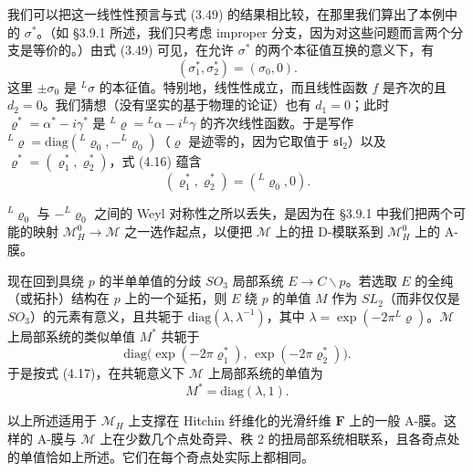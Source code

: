我们可以把这一线性性预言与式 (3.49) 的结果相比较，在那里我们算出了本例中的 $\sigma^*$。（如 §3.9.1 所述，我们只考虑 improper 分支，因为对这些问题而言两个分支是等价的。）由式 (3.49) 可见，在允许 $\sigma^*$ 的两个本征值互换的意义下，有
\begin{equation}\tag{4.16}
(\sigma_1^*,\sigma_2^*)=(\sigma_0,0).
\end{equation}
这里 $\pm\sigma_0$ 是 ${}^L\sigma$ 的本征值。特别地，线性性成立，而且线性函数 $f$ 是齐次的且 $d_2=0$。我们猜想（没有坚实的基于物理的论证）也有 $d_1=0$；此时 $\varrho^*=\alpha^*-i\gamma^*$ 是 ${}^L\varrho={}^L\alpha-i{}^L\gamma$ 的齐次线性函数。于是写作 ${}^L\varrho=\mathrm{diag}({}^L\varrho_0,-{}^L\varrho_0)$（$\varrho$ 是迹零的，因为它取值于 $\mathfrak{sl}_2$）以及 $\varrho^*=(\varrho_1^*,\varrho_2^*)$，式 (4.16) 蕴含
\begin{equation}\tag{4.17}
(\varrho_1^*,\varrho_2^*)=({}^L\varrho_0,0).
\end{equation}

${}^L\varrho_0$ 与 $-{}^L\varrho_0$ 之间的 Weyl 对称性之所以丢失，是因为在 §3.9.1 中我们把两个可能的映射 $\mathcal{M}_H^0\to\mathcal{M}$ 之一选作起点，以便把 $\mathcal{M}$ 上的扭 D-模联系到 $\mathcal{M}_H^0$ 上的 A-膜。


现在回到具绕 $p$ 的半单单值的分歧 $SO_3$ 局部系统 $E\to C\backslash p$。若选取 $E$ 的全纯（或拓扑）结构在 $p$ 上的一个延拓，则 $E$ 绕 $p$ 的单值 $M$ 作为 $SL_2$（而非仅仅是 $SO_3$）的元素有意义，且共轭于 $\mathrm{diag}(\lambda,\lambda^{-1})$，其中 $\lambda=\exp(-2\pi{}^L\varrho)$。$\mathcal{M}$ 上局部系统的类似单值 $M^*$ 共轭于
\[
\mathrm{diag}\bigl(\exp(-2\pi\varrho_1^*),\,\exp(-2\pi\varrho_2^*)\bigr).
\]
于是按式 (4.17)，在共轭意义下 $\mathcal{M}$ 上局部系统的单值为
\begin{equation}\tag{4.18}
M^*=\mathrm{diag}(\lambda,1).
\end{equation}

以上所述适用于 $\mathcal{M}_H$ 上支撑在 Hitchin 纤维化的光滑纤维 $\boldsymbol{F}$ 上的一般 A-膜。这样的 A-膜与
$\mathcal{M}$ 上在少数几个点处奇异、秩 2 的扭局部系统相联系，且各奇点处的单值恰如上所述。它们在每个奇点处实际上都相同。

